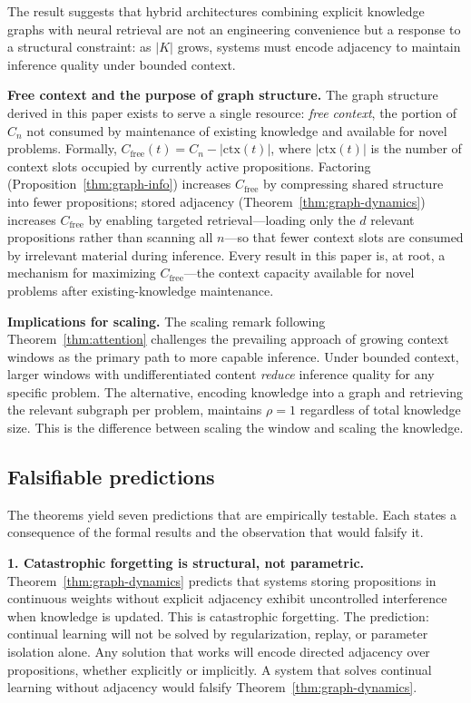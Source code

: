 \documentclass[11pt]{article}
\theoremstyle{definition}
\begin{document}
The result suggests that hybrid architectures combining explicit
knowledge graphs with neural retrieval are not an engineering
convenience but a response to a structural constraint: as $|K|$ grows,
systems must encode adjacency to maintain inference quality under bounded
context.

\textbf{Free context and the purpose of graph structure.}
The graph structure derived in this paper exists to serve a single
resource: \emph{free context}, the portion of $C_n$ not consumed by
maintenance of existing knowledge and available for novel problems.
Formally, $C_{\mathrm{free}}(t) = C_n - |\mathrm{ctx}(t)|$,
where $|\mathrm{ctx}(t)|$ is the number of context slots occupied by
currently active propositions. Factoring
(Proposition~\ref{thm:graph-info}) increases $C_{\mathrm{free}}$ by
compressing shared structure into fewer propositions; stored adjacency
(Theorem~\ref{thm:graph-dynamics}) increases $C_{\mathrm{free}}$ by
enabling targeted retrieval---loading only the $d$ relevant propositions
rather than scanning all $n$---so that fewer context slots are consumed
by irrelevant material during inference. Every result in this paper is, at root,
a mechanism for maximizing $C_{\mathrm{free}}$---the context capacity
available for novel problems after existing-knowledge maintenance.

\textbf{Implications for scaling.}
The scaling remark following Theorem~\ref{thm:attention} challenges the
prevailing approach of growing context windows as the primary path to
more capable inference.
Under bounded context, larger windows with undifferentiated content
\emph{reduce} inference quality for any specific problem. The
alternative, encoding knowledge into a graph and retrieving the
relevant subgraph per problem, maintains $\rho = 1$ regardless of
total knowledge size. This is the difference between scaling the window
and scaling the knowledge.

\subsection{Falsifiable predictions}

The theorems yield seven predictions that are empirically testable. Each
states a consequence of the formal results and the observation that
would falsify it.

\textbf{1. Catastrophic forgetting is structural, not parametric.}
Theorem~\ref{thm:graph-dynamics} predicts that systems storing
propositions in continuous weights without explicit adjacency exhibit
uncontrolled interference when knowledge is updated. This is
catastrophic forgetting. The prediction: continual learning will not be
solved by regularization, replay, or parameter isolation alone. Any
solution that works will encode directed adjacency over propositions,
whether explicitly or implicitly. A system that solves continual
learning without adjacency would falsify Theorem~\ref{thm:graph-dynamics}.
\end{document}
